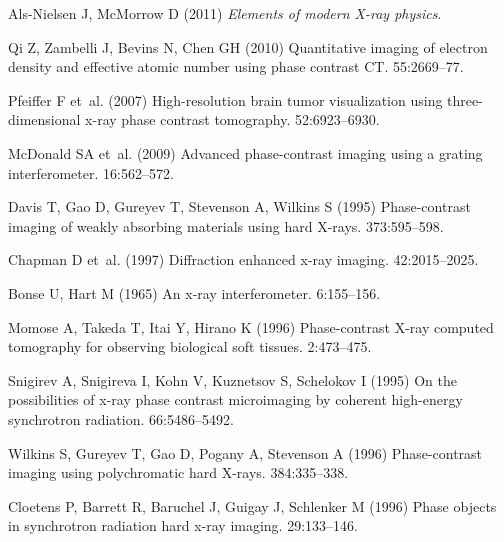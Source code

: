 \documentclass{pnastwo}
\begin{document}
\begin{article}

%
%
\begin{thebibliography}{10}

Als-Nielsen J, McMorrow D (2011) {\em {Elements of modern X-ray physics}}.

Qi Z, Zambelli J, Bevins N, Chen GH (2010) {Quantitative imaging of electron
  density and effective atomic number using phase contrast CT.}
 55:2669--77.

Pfeiffer F et~al. (2007) {High-resolution brain tumor visualization using
  three-dimensional x-ray phase contrast tomography.}
 52:6923--6930.

McDonald SA et~al. (2009) {Advanced phase-contrast imaging using a grating
  interferometer}.
 16:562--572.

Davis T, Gao D, Gureyev T, Stevenson A, Wilkins S (1995) {Phase-contrast
  imaging of weakly absorbing materials using hard X-rays}.
 373:595--598.

Chapman D et~al. (1997) {Diffraction enhanced x-ray imaging}.
 42:2015--2025.

Bonse U, Hart M (1965) {An x-ray interferometer}.
 6:155--156.

Momose A, Takeda T, Itai Y, Hirano K (1996) {Phase-contrast X-ray computed
  tomography for observing biological soft tissues}.
 2:473--475.

Snigirev A, Snigireva I, Kohn V, Kuznetsov S, Schelokov I (1995) {On the
  possibilities of x-ray phase contrast microimaging by coherent high-energy
  synchrotron radiation}.
 66:5486--5492.

Wilkins S, Gureyev T, Gao D, Pogany A, Stevenson A (1996) {Phase-contrast
  imaging using polychromatic hard X-rays}.
 384:335--338.

Cloetens P, Barrett R, Baruchel J, Guigay J, Schlenker M (1996) {Phase objects
  in synchrotron radiation hard x-ray imaging}.
 29:133--146.


\end{thebibliography}
\end{article}
\end{document}
